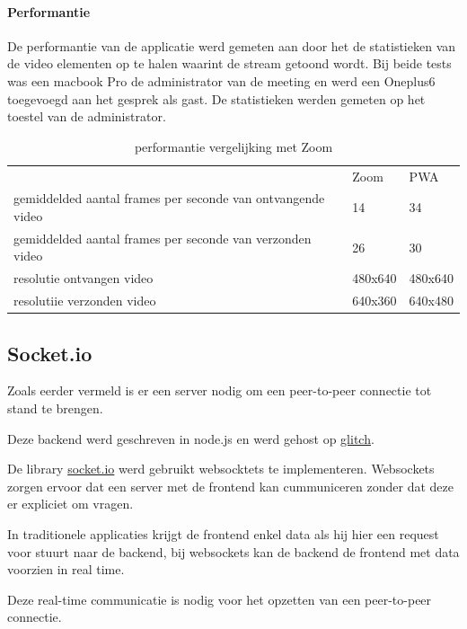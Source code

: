 		\paragraph{Performantie}
		
			De performantie van de applicatie werd gemeten aan door het de statistieken van de video elementen op te halen waarint de stream getoond wordt. Bij beide tests was een macbook Pro de administrator van de meeting en werd een Oneplus6 toegevoegd aan het gesprek als gast. De statistieken werden gemeten op het toestel van de administrator.
			
			\begin{table}[H]
			\centering
			\begin{tabular}{lll}													& Zoom 			& PWA \\
				gemiddelded aantal frames per seconde van ontvangende video 	 & 14				&  34 \\
				gemiddelded aantal frames per seconde van verzonden video		   & 26				   & 30	 \\
				resolutie ontvangen video  						  & 480x640 	&  480x640  \\
				resolutiie verzonden video						   & 640x360	& 	640x480\\
			\end{tabular}	
			\caption{performantie vergelijking met Zoom}
			\end{table}
	

	\subsection{Socket.io}
	
		Zoals eerder vermeld is er een server nodig om een peer-to-peer connectie tot stand te brengen.
		
		Deze backend werd geschreven in node.js en werd gehost op \href{https://glitch.com/}{glitch}.
		
		De library \href{https://socket.io/}{socket.io} werd gebruikt websocktets te implementeren. Websockets zorgen ervoor dat een server met de frontend kan cummuniceren zonder dat deze er expliciet om vragen. 
		
		In traditionele applicaties krijgt de frontend enkel data als hij hier een request voor stuurt naar de backend, bij websockets kan de backend de frontend met data voorzien in real time.
		\autocite{Mozilla2020e}
		
		Deze real-time communicatie is nodig voor het opzetten van een peer-to-peer connectie.
		
